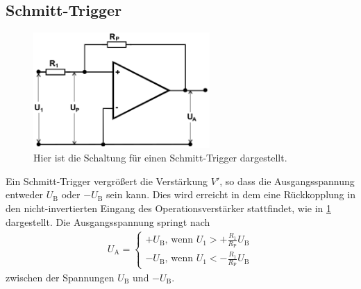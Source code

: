 \subsection{Schmitt-Trigger}
\begin{figure}[h!]
	\centering
	\includegraphics[width = 0.6\textwidth]{../Grafiken/Schmitt-Trigger.png}
	\caption{Hier ist die Schaltung für einen Schmitt-Trigger dargestellt. \cite{V51}\label{fig:Schmitt-Trigger}}
\end{figure}
Ein Schmitt-Trigger vergrößert die Verstärkung $V'$, so dass die Ausgangsspannung entweder $U_\text{B}$ oder $-U_\text{B}$ sein kann.
Dies wird erreicht in dem eine Rückkopplung in den nicht-invertierten Eingang des Operationsverstärker stattfindet, wie in \cref{fig:Schmitt-Trigger} dargestellt.
Die Ausgangsspannung springt nach
\begin{align}
	U_\text{A}=
	\begin{cases}
		+U_\text{B}\text{, wenn } U_1 > +\frac{R_1}{R_\text{P}}U_\text{B} \\
		-U_\text{B}\text{, wenn } U_1 < -\frac{R_1}{R_\text{P}}U_\text{B}
	\end{cases}\label{eq:kippspannug}
\end{align}
zwischen der Spannungen $U_\text{B}$ und $-U_\text{B}$.
\newpage
